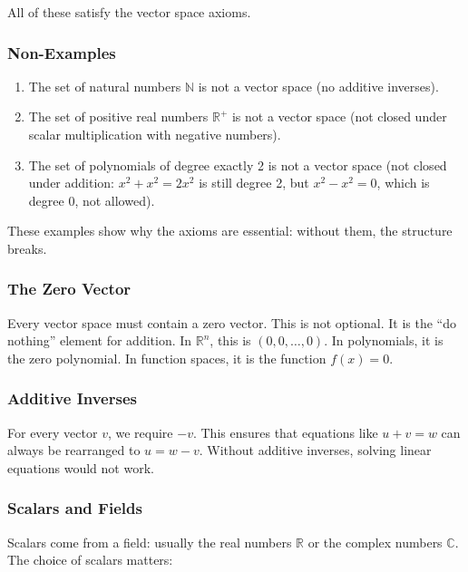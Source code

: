 \documentclass[
  letterpaper,
  DIV=11,
  numbers=noendperiod]{scrreprt}
\providecommand{\tightlist}{%
  \setlength{\itemsep}{0pt}\setlength{\parskip}{0pt}}
\begin{document}
All of these satisfy the vector space axioms.

\subsubsection{Non-Examples}\label{non-examples}

\begin{enumerate}
\def\labelenumi{\arabic{enumi}.}
\tightlist
\item
  The set of natural numbers \(\mathbb{N}\) is not a vector space (no
  additive inverses).
\item
  The set of positive real numbers \(\mathbb{R}^+\) is not a vector
  space (not closed under scalar multiplication with negative numbers).
\item
  The set of polynomials of degree exactly 2 is not a vector space (not
  closed under addition: \(x^2 + x^2 = 2x^2\) is still degree 2, but
  \(x^2 - x^2 = 0\), which is degree 0, not allowed).
\end{enumerate}

These examples show why the axioms are essential: without them, the
structure breaks.

\subsubsection{The Zero Vector}\label{the-zero-vector}

Every vector space must contain a zero vector. This is not optional. It
is the ``do nothing'' element for addition. In \(\mathbb{R}^n\), this is
\((0,0,\dots,0)\). In polynomials, it is the zero polynomial. In
function spaces, it is the function \(f(x) = 0\).

\subsubsection{Additive Inverses}\label{additive-inverses}

For every vector \(v\), we require \(-v\). This ensures that equations
like \(u+v=w\) can always be rearranged to \(u=w-v\). Without additive
inverses, solving linear equations would not work.

\subsubsection{Scalars and Fields}\label{scalars-and-fields}

Scalars come from a field: usually the real numbers \(\mathbb{R}\) or
the complex numbers \(\mathbb{C}\). The choice of scalars matters:
\end{document}
